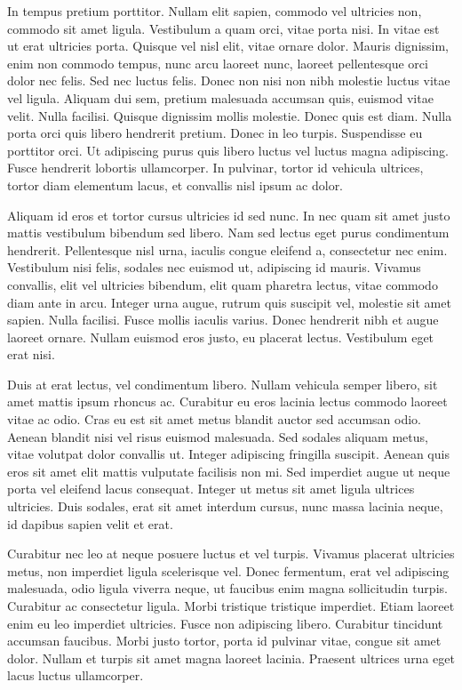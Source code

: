 In tempus pretium porttitor.
Nullam elit sapien, commodo vel ultricies non, commodo sit amet ligula.
Vestibulum a quam orci, vitae porta nisi.
In vitae est ut erat ultricies porta.
Quisque vel nisl elit, vitae ornare dolor.
Mauris dignissim, enim non commodo tempus, nunc arcu laoreet nunc, laoreet pellentesque orci dolor nec felis.
Sed nec luctus felis.
Donec non nisi non nibh molestie luctus vitae vel ligula.
Aliquam dui sem, pretium malesuada accumsan quis, euismod vitae velit.
Nulla facilisi.
Quisque dignissim mollis molestie.
Donec quis est diam.
Nulla porta orci quis libero hendrerit pretium.
Donec in leo turpis.
Suspendisse eu porttitor orci.
Ut adipiscing purus quis libero luctus vel luctus magna adipiscing.
Fusce hendrerit lobortis ullamcorper.
In pulvinar, tortor id vehicula ultrices, tortor diam elementum lacus, et convallis nisl ipsum ac dolor.

Aliquam id eros et tortor cursus ultricies id sed nunc.
In nec quam sit amet justo mattis vestibulum bibendum sed libero.
Nam sed lectus eget purus condimentum hendrerit.
Pellentesque nisl urna, iaculis congue eleifend a, consectetur nec enim.
Vestibulum nisi felis, sodales nec euismod ut, adipiscing id mauris.
Vivamus convallis, elit vel ultricies bibendum, elit quam pharetra lectus, vitae commodo diam ante in arcu.
Integer urna augue, rutrum quis suscipit vel, molestie sit amet sapien.
Nulla facilisi.
Fusce mollis iaculis varius.
Donec hendrerit nibh et augue laoreet ornare.
Nullam euismod eros justo, eu placerat lectus.
Vestibulum eget erat nisi.

Duis at erat lectus, vel condimentum libero.
Nullam vehicula semper libero, sit amet mattis ipsum rhoncus ac.
Curabitur eu eros lacinia lectus commodo laoreet vitae ac odio.
Cras eu est sit amet metus blandit auctor sed accumsan odio.
Aenean blandit nisi vel risus euismod malesuada.
Sed sodales aliquam metus, vitae volutpat dolor convallis ut.
Integer adipiscing fringilla suscipit.
Aenean quis eros sit amet elit mattis vulputate facilisis non mi.
Sed imperdiet augue ut neque porta vel eleifend lacus consequat.
Integer ut metus sit amet ligula ultrices ultricies.
Duis sodales, erat sit amet interdum cursus, nunc massa lacinia neque, id dapibus sapien velit et erat.

Curabitur nec leo at neque posuere luctus et vel turpis.
Vivamus placerat ultricies metus, non imperdiet ligula scelerisque vel.
Donec fermentum, erat vel adipiscing malesuada, odio ligula viverra neque, ut faucibus enim magna sollicitudin turpis.
Curabitur ac consectetur ligula.
Morbi tristique tristique imperdiet.
Etiam laoreet enim eu leo imperdiet ultricies.
Fusce non adipiscing libero.
Curabitur tincidunt accumsan faucibus.
Morbi justo tortor, porta id pulvinar vitae, congue sit amet dolor.
Nullam et turpis sit amet magna laoreet lacinia.
Praesent ultrices urna eget lacus luctus ullamcorper.

